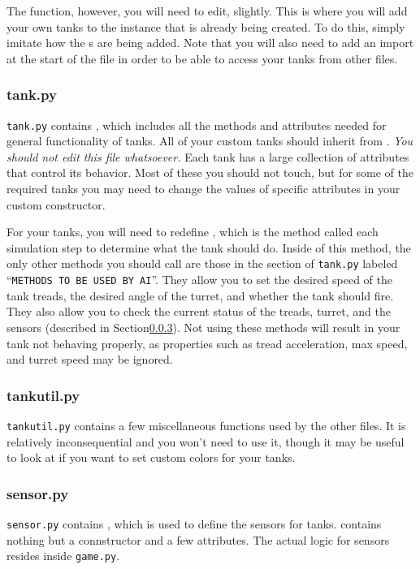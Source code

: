\documentclass[11pt]{cselabheader}
\begin{document}
The  function, however, you will need to edit, slightly.
This is where you will add your own tanks to the  instance
that is already being created. To do this, simply imitate how the
s are being added. Note that you will also need to add
an import at the start of the file in order to be able to access your tanks from
other files.

\subsubsection{tank.py}
\texttt{tank.py} contains , which includes all the
methods and attributes needed for general functionality of tanks. All of your
custom tanks should inherit from . \emph{You should not edit
this file whatsoever.} Each tank has a large collection of attributes that
control its behavior. Most of these you should not touch, but for some of the
required tanks you may need to change the values of specific attributes in
your custom constructor.

For your tanks, you will need to redefine
, which is the method called each simulation step
to determine what the tank should do. Inside of this method, the only other
methods you should call are those in the section of \texttt{tank.py} labeled
``\texttt{METHODS TO BE USED BY AI}''. They allow you to set the desired speed
of the tank treads, the desired angle of the turret, and whether the tank should
fire. They also allow you to check the current status of the treads, turret, and
the sensors (described in Section\ref{subsubsec:sensor}). Not using these
methods will result in your tank not behaving properly, as properties such as
tread acceleration, max speed, and turret speed may be ignored.

\subsubsection{tankutil.py}
\texttt{tankutil.py} contains a few miscellaneous functions used by the other
files. It is relatively inconsequential and you won't need to use it, though it
may be useful to look at if you want to set custom colors for your tanks.

\subsubsection{sensor.py}
\label{subsubsec:sensor}
\texttt{sensor.py} contains , which is used to define
the sensors for tanks.  contains nothing but a connstructor
and a few attributes. The actual logic for sensors resides inside
\texttt{game.py}.
\end{document}
